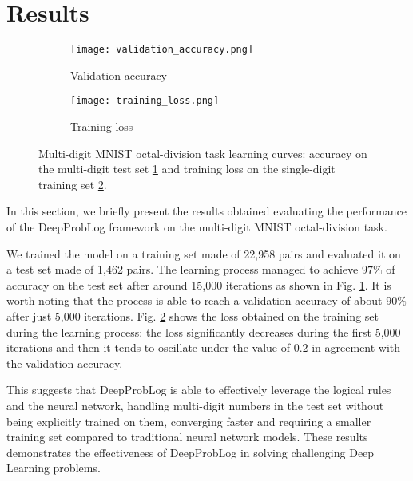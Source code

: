 \section{Results}
\label{sec:results}

\begin{figure}[t]
    \centering
    \begin{subfigure}[b]{0.45\textwidth}
        \centerline{\texttt{[image: validation\_accuracy.png]}}
        \caption{Validation accuracy}
        \label{fig:acc}
    \end{subfigure}
    \hfill
    \begin{subfigure}[b]{0.45\textwidth}
        \centerline{\texttt{[image: training\_loss.png]}}
        \caption{Training loss}
        \label{fig:loss}
    \end{subfigure}
    \caption{Multi-digit MNIST octal-division task learning curves: accuracy on the multi-digit test set \ref{fig:acc} and training loss on the single-digit training set \ref{fig:loss}.}
    \label{fig:training_curves}
\end{figure}

In this section, we briefly present the results obtained evaluating the performance of the DeepProbLog framework on the multi-digit MNIST octal-division task.

We trained the model on a training set made of 22,958 pairs and evaluated it on a test set made of 1,462 pairs.
The learning process managed to achieve $97\%$ of accuracy on the test set after around 15,000 iterations as shown in Fig. \ref{fig:acc}. It is worth noting that the process is able to reach a validation accuracy of about $90\%$ after just 5,000 iterations.
Fig. \ref{fig:loss} shows the loss obtained on the training set during the learning process: the loss significantly decreases during the first 5,000 iterations and then it tends to oscillate under the value of $0.2$ in agreement with the validation accuracy.

This suggests that DeepProbLog is able to effectively leverage the logical rules and the neural network, handling multi-digit numbers in the test set without being explicitly trained on them, converging faster and requiring a smaller training set compared to traditional neural network models. These results demonstrates the effectiveness of DeepProbLog in solving challenging Deep Learning problems.

